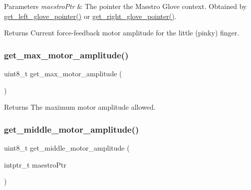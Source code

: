 \begin{DoxyParams}{Parameters}
{\em maestro\+Ptr} & The pointer the Maestro Glove context. Obtained by \hyperlink{group__glove_management_ga63ce3c99d4a8b8db851b22af9185764e}{get\+\_\+left\+\_\+glove\+\_\+pointer()} or \hyperlink{group__glove_management_ga9b8fd9d91aeac3f8da50f7a7eba0c32b}{get\+\_\+right\+\_\+glove\+\_\+pointer()}. \\
\hline
\end{DoxyParams}
\begin{DoxyReturn}{Returns}
Current force-\/feedback motor amplitude for the little (pinky) finger. 
\end{DoxyReturn}
\mbox{\label{group__force_feedback_control_ga9d7356bde899e98b4b79183595480857}} 
\subsubsection{\texorpdfstring{get\+\_\+max\+\_\+motor\+\_\+amplitude()}{get\_max\_motor\_amplitude()}}
{\footnotesize\ttfamily uint8\+\_\+t get\+\_\+max\+\_\+motor\+\_\+amplitude (\begin{DoxyParamCaption}{ }\end{DoxyParamCaption})}

\begin{DoxyReturn}{Returns}
The maximum motor amplitude allowed. 
\end{DoxyReturn}
\mbox{\label{group__force_feedback_control_ga8d6036a18ed2a0a977fbd861b373f389}} 
\subsubsection{\texorpdfstring{get\+\_\+middle\+\_\+motor\+\_\+amplitude()}{get\_middle\_motor\_amplitude()}}
{\footnotesize\ttfamily uint8\+\_\+t get\+\_\+middle\+\_\+motor\+\_\+amplitude (\begin{DoxyParamCaption}\item[{intptr\+\_\+t}]{maestro\+Ptr }\end{DoxyParamCaption})}



